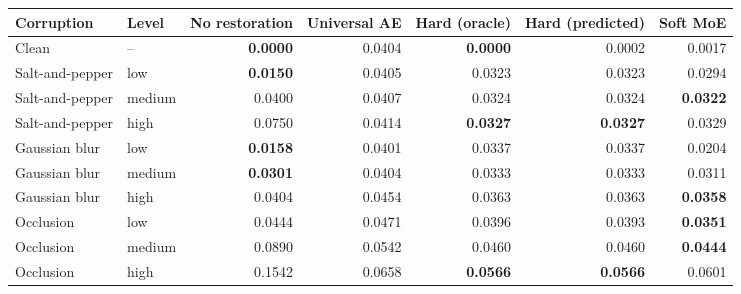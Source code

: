 \begin{tabular}{llrrrrr}
\toprule
Corruption & Level & No restoration & Universal AE & Hard (oracle) & Hard (predicted) & Soft MoE \\
\midrule
Clean & -- & \textbf{0.0000} & 0.0404 & \textbf{0.0000} & 0.0002 & 0.0017 \\
Salt-and-pepper & low & \textbf{0.0150} & 0.0405 & 0.0323 & 0.0323 & 0.0294 \\
Salt-and-pepper & medium & 0.0400 & 0.0407 & 0.0324 & 0.0324 & \textbf{0.0322} \\
Salt-and-pepper & high & 0.0750 & 0.0414 & \textbf{0.0327} & \textbf{0.0327} & 0.0329 \\
Gaussian blur & low & \textbf{0.0158} & 0.0401 & 0.0337 & 0.0337 & 0.0204 \\
Gaussian blur & medium & \textbf{0.0301} & 0.0404 & 0.0333 & 0.0333 & 0.0311 \\
Gaussian blur & high & 0.0404 & 0.0454 & 0.0363 & 0.0363 & \textbf{0.0358} \\
Occlusion & low & 0.0444 & 0.0471 & 0.0396 & 0.0393 & \textbf{0.0351} \\
Occlusion & medium & 0.0890 & 0.0542 & 0.0460 & 0.0460 & \textbf{0.0444} \\
Occlusion & high & 0.1542 & 0.0658 & \textbf{0.0566} & \textbf{0.0566} & 0.0601 \\
\bottomrule
\end{tabular}
